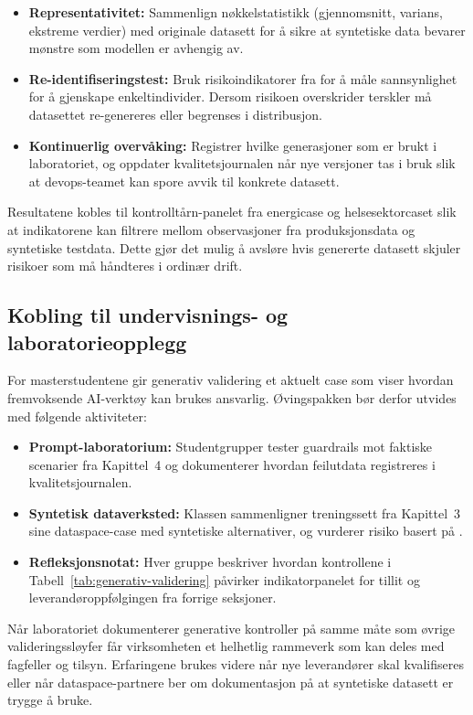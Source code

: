 \begin{itemize}
    \item \textbf{Representativitet:} Sammenlign nøkkelstatistikk (gjennomsnitt, varians, ekstreme verdier) med originale datasett for å sikre at syntetiske data bevarer mønstre som modellen er avhengig av.
    \item \textbf{Re-identifiseringstest:} Bruk risikoindikatorer fra \citet{datatilsynet2022anonymisering} for å måle sannsynlighet for å gjenskape enkeltindivider. Dersom risikoen overskrider terskler må datasettet re-genereres eller begrenses i distribusjon.
    \item \textbf{Kontinuerlig overvåking:} Registrer hvilke generasjoner som er brukt i laboratoriet, og oppdater kvalitetsjournalen når nye versjoner tas i bruk slik at devops-teamet kan spore avvik til konkrete datasett.
\end{itemize}

Resultatene kobles til kontrolltårn-panelet fra energicase og helsesektorcaset slik at indikatorene kan filtrere mellom observasjoner fra produksjonsdata og syntetiske testdata. Dette gjør det mulig å avsløre hvis genererte datasett skjuler risikoer som må håndteres i ordinær drift.

\subsection{Kobling til undervisnings- og laboratorieopplegg}
For masterstudentene gir generativ validering et aktuelt case som viser hvordan fremvoksende AI-verktøy kan brukes ansvarlig. Øvingspakken bør derfor utvides med følgende aktiviteter:
\begin{itemize}
    \item \textbf{Prompt-laboratorium:} Studentgrupper tester guardrails mot faktiske scenarier fra Kapittel~4 og dokumenterer hvordan feilutdata registreres i kvalitetsjournalen.
    \item \textbf{Syntetisk dataverksted:} Klassen sammenligner treningssett fra Kapittel~3 sine dataspace-case med syntetiske alternativer, og vurderer risiko basert på \citet{datatilsynet2022anonymisering}.
    \item \textbf{Refleksjonsnotat:} Hver gruppe beskriver hvordan kontrollene i Tabell~\ref{tab:generativ-validering} påvirker indikatorpanelet for tillit og leverandøroppfølgingen fra forrige seksjoner.
\end{itemize}

Når laboratoriet dokumenterer generative kontroller på samme måte som øvrige valideringssløyfer får virksomheten et helhetlig rammeverk som kan deles med fagfeller og tilsyn. Erfaringene brukes videre når nye leverandører skal kvalifiseres eller når dataspace-partnere ber om dokumentasjon på at syntetiske datasett er trygge å bruke.

